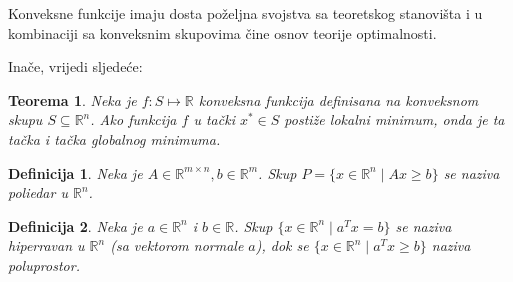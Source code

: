 \documentclass[a4paper, utf8, 11pt, colorlinks]{article}
\newtheorem{definition}{Definicija}
\newtheorem{thm}{Teorema}
\newenvironment{proof}{{Dokaz:}}{\hfill$\square$}
\begin{document}
Konveksne funkcije imaju dosta poželjna svojstva sa teoretskog stanovišta i u kombinaciji sa konveksnim skupovima čine osnov   teorije optimalnosti. 

Inače, vrijedi sljedeće:
\begin{thm}
  Neka je $f : S \mapsto \mathbb{R}$ konveksna funkcija definisana na konveksnom skupu $S \subseteq \mathbb{R}^n$. Ako funkcija $f$ u tački $x^* \in S$
 postiže lokalni minimum, onda je ta tačka i tačka globalnog minimuma.
\end{thm}

\begin{definition}
   Neka je $A \in \mathbb{R}^{m \times n}, b \in \mathbb{R}^m$. Skup $P=\{x \in \mathbb{R}^n \mid Ax \geq b\}$ se naziva poliedar u $\mathbb{R}^n$. 
\end{definition}
\begin{definition}
   Neka je $a\in \mathbb{R}^n $ i $b \in \mathbb{R}$. Skup $\{ x \in \mathbb{R}^n \mid a^T x = b \}$ se naziva hiperravan u $\mathbb{R}^n$ (sa vektorom normale $a$), dok se $\{ x \in \mathbb{R}^n \mid a^T x \geq b \}$ naziva poluprostor. 
\end{definition}
\end{document}
